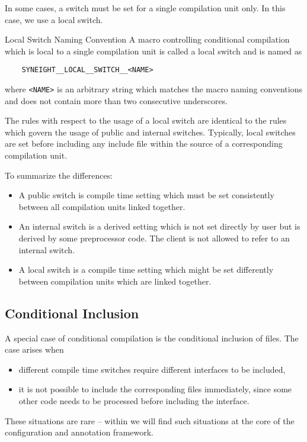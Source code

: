 In some cases, a switch must be set for a single compilation unit
only. In this case, we use a local switch.
%
\begin{rule*}{Local Switch Naming Convention}
  A macro controlling conditional compilation which is local to a
  single compilation unit is called a local switch and is named as
  \begin{verbatim}
    SYNEIGHT__LOCAL__SWITCH__<NAME>
  \end{verbatim}
  where {\tt <NAME>} is an arbitrary string which matches the macro
  naming conventions and does not contain more than two consecutive
  underscores.
\end{rule*}
%
The rules with respect to the usage of a local switch are identical to
the rules which govern the usage of public and internal
switches. Typically, local switches are set before including any
include file within the source of a corresponding compilation unit.

To summarize the differences:
\begin{itemize}
\item A public switch is compile time setting which must be set
  consistently between all compilation units linked together.
\item An internal switch is a derived setting which is not set
  directly by user but is derived by some preprocessor code. The
  client is not allowed to refer to an internal switch.
\item A local switch is a compile time setting which might be
  set differently between compilation units which are linked
  together. 
\end{itemize}

\subsection{Conditional Inclusion}
\label{sec:cond-incl}

A special case of conditional compilation is the conditional inclusion
of files. The case arises when 
\begin{itemize}
\item different compile time switches require different interfaces to
  be included,
\item it is not possible to include the corresponding files
  immediately, since some other code needs to be processed before
  including the interface.
\end{itemize}
These situations are rare -- within \SYNEIGHT we will find such
situations at the core of the configuration and annotation
framework.

